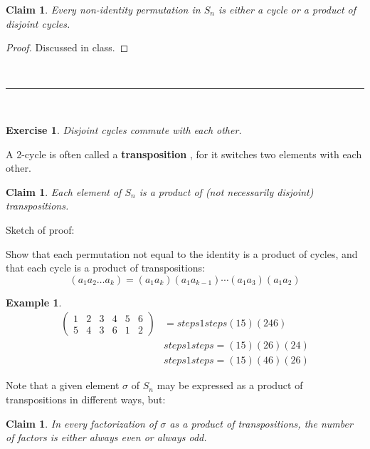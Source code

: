 \documentclass[a4paper,12pt]{report}
\newcommand{\class}{}
\newcounter{statement}
\numberwithin{statement}{chapter}
\newtheorem{claim}[statement]{Claim}
\newtheorem{eg}[statement]{\bf Example}
\newtheorem{ex}[statement]{\bf Exercise}
\numberwithin{equation}{chapter}
\numberwithin{section}{chapter}
\numberwithin{subsection}{section}
\begin{document}
\begin{claim}
Every non-identity permutation in $S_n$ is either a cycle or a product of disjoint cycles.
\end{claim}
\begin{proof}
Discussed in class.
\end{proof}




\quad\\\hrule
\quad\\

\begin{ex}

Disjoint cycles commute with each other.

\end{ex}




A 2-cycle is often called a  {\bf transposition} ,
for it switches two elements with each other.



\begin{claim}
Each element of $S_n$ is a product of (not necessarily disjoint) transpositions.
\end{claim}



Sketch of proof:


Show that each permutation not equal to the identity is a product of cycles,
and that each cycle is a product of transpositions:
\[
(a_1a_2\ldots a_k) = (a_1 a_k) (a_1 a_{k - 1})\cdots(a_1 a_3)(a_1 a_2)
\]

\begin{eg}


\[
\begin{split}
\left(
\begin{matrix}
1&2&3&4&5&6\\
5&4&3&6&1&2
\end{matrix}
\right) &= 
\class{steps1 steps}{(15)(246)}
\\&
\class{steps1 steps}{= (15)(26)(24)}
\\&
\class{steps1 steps}{ = (15)(46)(26)}
\end{split}
\]


\end{eg}




Note that a given element $\sigma$ of $S_n$
may be expressed as a product of transpositions in different ways,
but:
\begin{claim}
In every factorization of $\sigma$ as a product of transpositions,
the number of factors is either always even or always odd.
\end{claim}
\end{document}
